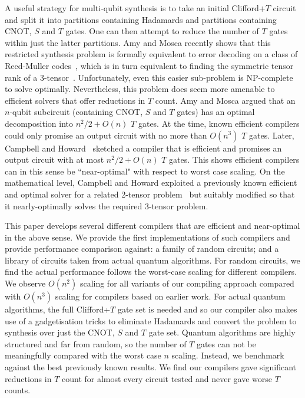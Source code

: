 \documentclass[notitlepage]{article}
\theoremstyle{definition}
\theoremstyle{problem}
\theoremstyle{lemma}
\begin{document}
		A useful strategy for multi-qubit synthesis is to take an initial Clifford+$T$ circuit and split it into partitions containing Hadamards and partitions containing CNOT, $S$ and $T$ gates.  One can then attempt to reduce the number of $T$ gates within just the latter partitions.  Amy and Mosca recently shows that this restricted synthesis problem is formally equivalent to error decoding on a class of Reed-Muller codes~\cite{amy16}, which is in turn equivalent to finding the symmetric tensor rank of a 3-tensor~\cite{seroussi80}.  Unfortunately, even this easier sub-problem is  NP-complete to solve optimally.  Nevertheless, this problem does seem more amenable to efficient solvers that offer reductions in $T$ count.  Amy and Mosca argued that an $n$-qubit subcircuit (containing CNOT, $S$ and $T$ gates) has an optimal decomposition into $n^2/2+O(n)$ $T$ gates.  At the time,  known efficient compilers could only promise an output circuit with no more than $O(n^3) $ $T$ gates.  Later, Campbell and Howard~\cite{campbell17b} sketched a compiler that is efficient and promises an output circuit with at most $n^2/2+O(n)$ $T$ gates.  This shows efficient compilers can in this sense be ``near-optimal" with respect to worst case scaling.   On the mathematical level, Campbell and Howard exploited a previously known efficient and optimal solver for a related 2-tensor problem~\cite{lempel75} but suitably modified so that it nearly-optimally solves the required 3-tensor problem.
		
		This paper develops several different compilers that are efficient and near-optimal in the above sense. We provide the first implementations of such compilers and provide performance comparison against: a family of random circuits; and a library of circuits taken from actual quantum algorithms.  For random circuits, we find the actual performance follows the worst-case scaling for different compilers.  We observe  $O(n^2)$ scaling for all variants of our compiling approach compared with $O(n^3)$ scaling for compilers based on earlier work.   For actual quantum algorithms, the full Clifford+$T$ gate set is needed and so our compiler also makes use of a gadgetisation tricks to eliminate Hadamards and convert the problem to synthesis over just the CNOT, $S$ and $T$ gate set.  Quantum algorithms are highly structured and far from random, so the number of $T$ gates can not be meaningfully compared with the worst case $n$ scaling.  Instead, we benchmark against the best previously known results.  We  find our compilers gave significant reductions in $T$ count for almost every circuit tested and never gave worse $T$ counts.
		
\end{document}
